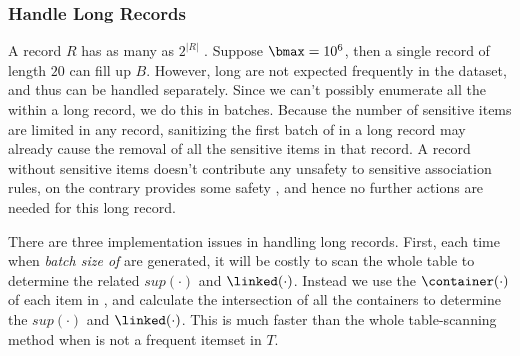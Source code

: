 \subsubsection{Handle Long Records}
A record $R$ has as many as $2^{|R|}$ \qids. Suppose $\bmax = 10^6$, then a
single record of length $20$ can fill up $B$. However, long \qids are not
expected frequently in the dataset, and thus can be handled separately. Since
we can't possibly enumerate all the \qids within a long record, we do this in
batches. Because the number of sensitive items are limited in any record,
sanitizing the first batch of \qids in a long record may already cause the
removal of all the sensitive items in that record. A record without sensitive
items doesn't contribute any unsafety to sensitive association rules, on the
contrary provides some safety , and hence no further actions are needed for this long
record.

There are three implementation issues in handling long records. First, each
time when {\em batch size of } \qids are generated, it will be costly to scan
the whole table to determine the related $sup(\cdot)$ and
$\linked(\cdot)$. Instead we use the $\container(\cdot)$ of each item in
\qid, and calculate the intersection of all the containers to determine the
$sup(\cdot)$ and $\linked(\cdot)$. This is much faster than the whole
table-scanning method when \qid is not a frequent itemset in $T$.

